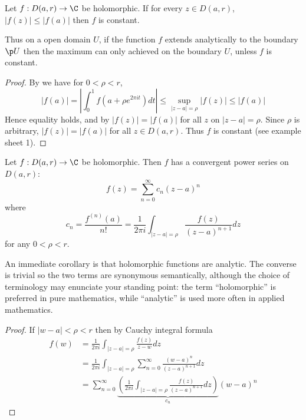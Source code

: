 \documentclass[a4paper]{article}
\begin{document}
\begin{theorem}
  \label{thm:local maximum principle}
  Let \(f: D(a, r) \to \C\) be holomorphic. If for every \(z \in D(a, r)\), \(|f(z)| \leq |f(a)|\) then \(f\) is constant.
\end{theorem}

Thus on a open domain \(U\), if the function \(f\) extends analytically to the boundary \(\p U\) then the maximum can only achieved on the boundary \(U\), unless \(f\) is constant.

\begin{proof}
  By  we have for \(0 < \rho < r\),
  \[
    |f(a)|
    = \left| \int_0^1 f(a + \rho e^{2\pi it}) dt \right|
    \leq \sup_{|z - a| = \rho} |f(z)|
    \leq |f(a)|
  \]
  Hence equality holds, and by  \(|f(z)| = |f(a)|\) for all \(z\) on \(|z - a| = \rho\). Since \(\rho\) is arbitrary, \(|f(z)| = |f(a)|\) for all \(z \in D(a, r)\). Thus \(f\) is constant (see example sheet 1).
\end{proof}

\begin{theorem}
  \label{thm:Taylor}
  Let \(f: D(a, r) \to \C\) be holomorphic. Then \(f\) has a convergent power series on \(D(a, r)\):
  \[
    f(z) = \sum_{n = 0}^\infty c_n (z - a)^n
  \]
  where
  \[
    c_n = \frac{f^{(n)}(a)}{n!} = \frac{1}{2\pi i} \int_{|z - a| = \rho} \frac{f(z)}{(z - a)^{n + 1}} dz
  \]
  for any \(0 < \rho < r\).
\end{theorem}

An immediate corollary is that holomorphic functions are analytic. The converse is trivial so the two terms are synonymous semantically, although the choice of terminology may enunciate your standing point: the term ``holomorphic'' is preferred in pure mathematics, while ``analytic'' is used more often in applied mathematics.

\begin{proof}
  If \(|w - a| < \rho < r\) then by Cauchy integral formula
  \begin{align*}
    f(w) &= \frac{1}{2\pi i} \int_{|z - a| = \rho} \frac{f(z)}{z - w} dz \\
         &= \frac{1}{2\pi i} \int_{|z - a| = \rho} \sum_{n = 0}^\infty \frac{(w - a)^n}{(z - a)^{n + 1}} dz \\
         &= \sum_{n = 0}^\infty \underbrace{\left( \frac{1}{2\pi i} \int_{|z - a| = \rho} \frac{f(z)}{(z - a)^{n + 1}} dz \right)}_{c_n} (w - a)^n
  \end{align*}
\end{proof}
\end{document}
